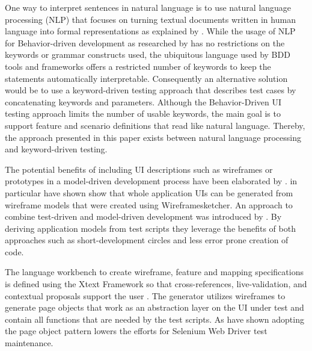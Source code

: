 \documentclass{sig-alternate-05-2015}
\begin{document}
One way to interpret sentences in natural language is to use natural language processing (NLP) that focuses on turning textual documents written in human language into formal representations as explained by \cite{collobert2008unified}.
While the usage of NLP for Behavior-driven development as researched by \cite{soeken2012assisted} has no restrictions on the keywords or grammar constructs used, the ubiquitous language used by BDD tools and frameworks offers a restricted number of keywords to keep the statements automatically interpretable.
Consequently an alternative solution would be to use a keyword-driven testing approach that describes test cases by concatenating keywords and parameters.
Although the Behavior-Driven UI testing approach limits the number of usable keywords, the main goal is to support feature and scenario definitions that read like natural language.
Thereby, the approach presented in this paper exists between natural language processing and keyword-driven testing.

The potential benefits of including UI descriptions such as wireframes or prototypes in a model-driven development process have been elaborated by \cite {Rivero2010}.
\cite{sanchezgui} in particular have shown show that whole application UIs can be generated from wireframe models that were created using Wireframesketcher.
An approach to combine test-driven and model-driven development was introduced by \cite{luna2009bridging}.
By deriving application models from test scripts they leverage the benefits of both approaches such as short-development circles and less error prone creation of code.

The language workbench to create wireframe, feature and mapping specifications is defined using the Xtext Framework so that cross-references, live-validation, and contextual proposals support the user \cite{Be13}.
The generator utilizes wireframes to generate page objects that work as an abstraction layer on the UI under test and contain all functions that are needed by the test scripts.
As \cite{leotta2013improving} have shown adopting the page object pattern lowers the efforts for Selenium Web Driver test maintenance.


\end{document}
